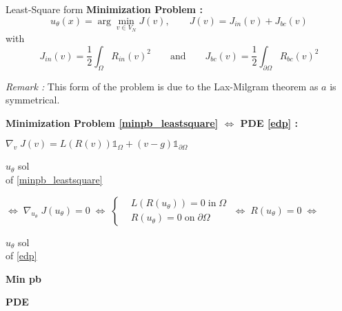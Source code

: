 \begin{frame}{Least-Square form}
	\textbf{Minimization Problem :}
	\begin{equation}
		u_\theta(x)=\arg\min_{v\in V_N} J(v), \qquad J(v)=J_{in}(v)+J_{bc}(v)\label{minpb_leastsquare}
	\end{equation}
	with 
	\begin{equation*}
		J_{in}(v)=\frac{1}{2}\int_\Omega R_{in}(v)^2  \qquad \text{and} \qquad J_{bc}(v)=\frac{1}{2}\int_{\partial\Omega} R_{bc}(v)^2
	\end{equation*}
	
	\footnotesize	
	\textit{Remark :} This form of the problem is due to the Lax-Milgram theorem as $a$ is symmetrical.
	\normalsize
	
	\footnotesize
	\begin{center}
		\begin{tcolorbox}[
			colback=white, %
			colframe=other, %
			arc=2mm, %
			boxrule=0.5pt, %
			breakable, enhanced jigsaw,
			width=\linewidth
			]
			
			\textbf{Minimization Problem \eqref{minpb_leastsquare} $\Leftrightarrow$ PDE \eqref{edp} :}
			
			\centering
			$\nabla_v \; J(v)=L(R(v))\mathds{1}_\Omega+(v-g)\mathds{1}_{\partial\Omega} \qquad $  
			
			\vspace{5pt}
			
			\begin{minipage}{0.1\linewidth}
				\centering
				$u_\theta$ sol \\
				of \eqref{minpb_leastsquare}
			\end{minipage} $\Leftrightarrow \; \nabla_{u_\theta} \; J(u_\theta)=0 \; \Leftrightarrow \; \left\{\begin{aligned}
				&L(R(u_\theta))=0 \; \text{in} \; \Omega \\
				&R(u_\theta)=0 \; \text{on} \; \partial\Omega
			\end{aligned}\right. \; \Leftrightarrow \; R(u_\theta)=0 \; \Leftrightarrow$ \begin{minipage}{0.1\linewidth}
				\centering
				$u_\theta$ sol \\
				of \eqref{edp}
			\end{minipage}
			
			\vspace{5pt}
			
			\begin{minipage}{0.1\linewidth}
				\centering
				\textbf{Min pb}
			\end{minipage} \; \hspace{210pt} \; \begin{minipage}{0.1\linewidth}
				\centering
				\textbf{PDE}
			\end{minipage}
		\end{tcolorbox}
	\end{center}
\end{frame}

